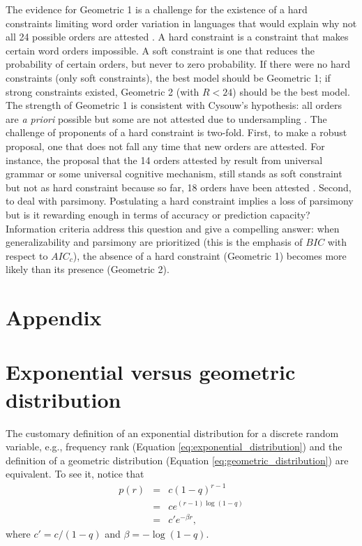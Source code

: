 \documentclass[USenglish]{article}
\begin{document}
The evidence for Geometric 1 is a challenge for the existence of a hard constraints limiting word order variation in languages that would explain why not all 24 possible orders are attested \citep{Cinque2005a, Cinque2013a,Medeiros2016a, Medeiros2018a}. A hard constraint is a constraint that makes certain word orders impossible. A soft constraint is one that reduces the probability of certain orders, but never to zero probability. If there were no hard constraints (only soft constraints), the best model should be Geometric 1; if strong constraints existed, Geometric 2 (with $R < 24$) should be the best model.
The strength of Geometric 1 is consistent with Cysouw's hypothesis: all orders are {\em a priori} possible but some are not attested due to undersampling \citep{Cysouw2010a}. The challenge of proponents of a hard constraint is two-fold. First, to make a robust proposal, one that does not fall any time that new orders are attested. For instance, the proposal that the 14 orders attested by \citet{Cinque2005a} result from universal grammar or some universal cognitive mechanism, still stands as soft constraint but not as hard constraint  \citep{Cinque2005a, Cinque2013a, Medeiros2016a, Medeiros2018a} because so far, 18 orders have been attested \citep{Dryer2018a}. Second, to deal with parsimony. %
Postulating a hard constraint implies a loss of parsimony but is it rewarding enough in terms of accuracy or prediction capacity? Information criteria address this question and give a compelling answer: when generalizability and parsimony are prioritized (this is the emphasis of $BIC$ with respect to $AIC_c$), the absence of a hard constraint (Geometric 1) becomes more likely than its presence (Geometric 2).

\section*{Appendix}

\appendix

\section{Exponential versus geometric distribution}

\label{app:exponential_distribution}

The customary definition of an exponential distribution for a discrete random variable, e.g., frequency rank (Equation \ref{eq:exponential_distribution}) and the definition of a geometric distribution (Equation \ref{eq:geometric_distribution}) are equivalent. To see it, notice that 
\begin{eqnarray*}
p(r) & = & c (1-q)^{r - 1} \\
     & = & c e^{(r - 1)\log(1-q) } \\
     & = & c' e^{-\beta r}, 
\end{eqnarray*}
where $c' = c/(1 - q)$ and $\beta = -\log(1-q)$.
\end{document}
